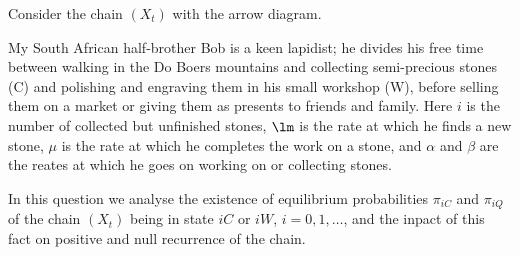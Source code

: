 \begin{problem}
Consider the chain $(X_t)$ with the arrow diagram.

My South African half-brother Bob is a keen lapidist; he divides his free time between walking in the Do Boers mountains and collecting semi-precious stones (C) and polishing and engraving them in his small workshop (W), before selling them on a market or giving them as presents to friends and family. Here $i$ is the number of collected but unfinished stones, $\lm$ is the rate at which he finds a new stone, $\mu$ is the rate at which he completes the
work on a stone, and $\alpha$ and $\beta$ are the reates at which he goes on working on or collecting stones.

In this question we analyse the existence of equilibrium probabilities $\pi_{iC}$ and $\pi_{iQ}$ of the chain $(X_t)$ being in state $iC$ or $iW$, $i = 0, 1,\dots$, and the inpact of this fact on positive and null recurrence of the chain.

\end{problem}
